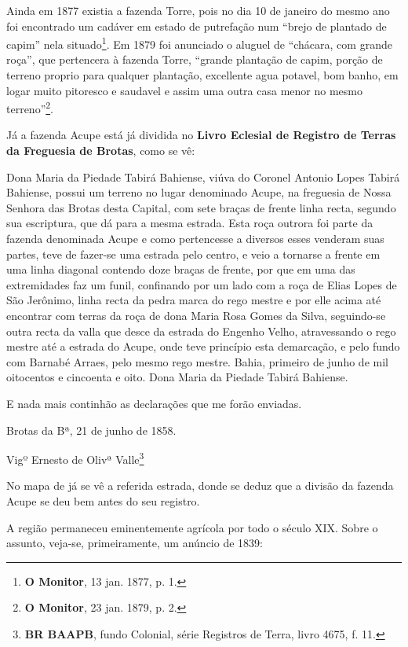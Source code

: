 Ainda em 1877 existia a fazenda Torre, pois no dia 10 de janeiro do mesmo ano foi encontrado um cadáver em estado de putrefação num ``brejo de plantado de capim'' nela situado\footnote{\textbf{O Monitor}, 13 jan. 1877, p. 1.}. Em 1879 foi anunciado o aluguel de ``chácara, com grande roça'', que pertencera à fazenda Torre, ``grande plantação de capim, porção de terreno proprio para qualquer plantação, excellente agua potavel, bom banho, em logar muito pitoresco e saudavel e assim uma outra casa menor no mesmo terreno''\footnote{\textbf{O Monitor}, 23 jan. 1879, p. 2.}.

Já a fazenda Acupe está já dividida no \textbf{Livro Eclesial de Registro de Terras da Freguesia de Brotas}, como se vê:

\begin{citacao}
Dona Maria da Piedade Tabirá Bahiense, viúva do Coronel Antonio Lopes Tabirá Bahiense, possui um terreno no lugar denominado Acupe, na freguesia de Nossa Senhora das Brotas desta Capital, com sete braças de frente linha recta, segundo sua escriptura, que dá para a mesma estrada. Esta roça outrora foi parte da fazenda denominada Acupe e como pertencesse a diversos esses venderam suas partes, teve de fazer-se uma estrada pelo centro, e veio a tornarse a frente em uma linha diagonal contendo doze braças de frente, por que em uma das extremidades faz um funil, confinando por um lado com a roça de Elias Lopes de São Jerônimo, linha recta da pedra marca do rego mestre e por elle acima até encontrar com terras da roça de dona Maria Rosa Gomes da Silva, seguindo-se outra recta da valla que desce da estrada do Engenho Velho, atravessando o rego mestre até a estrada do Acupe, onde teve princípio esta demarcação, e pelo fundo com Barnabé Arraes, pelo mesmo rego mestre. Bahia, primeiro de junho de mil oitocentos e cincoenta e oito. Dona Maria da Piedade Tabirá Bahiense.

E nada mais continhão as declarações que me forão enviadas.

Brotas da Bª, 21 de junho de 1858.

Vigº Ernesto de Olivª Valle\footnote{\textbf{BR BAAPB}, fundo Colonial, série Registros de Terra, livro 4675, f. 11.}
\end{citacao}

No mapa de  já se vê a referida estrada, donde se deduz que a divisão da fazenda Acupe se deu bem antes do seu registro. 

A região permaneceu eminentemente agrícola por todo o século XIX. Sobre o assunto, veja-se, primeiramente, um anúncio de 1839:

